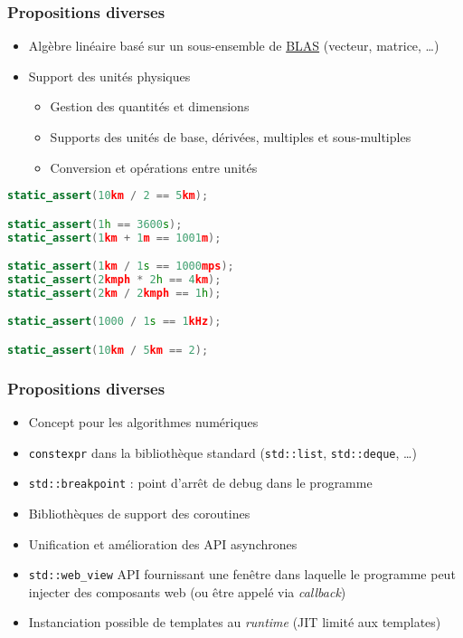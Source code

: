 \documentclass[C++.tex]{subfiles}
\begin{document}
\begin{frame}[fragile]
	\frametitle{Propositions diverses}
	\begin{itemize}
		\item Algèbre linéaire basé sur un sous-ensemble de \href{https://www.netlib.org/blas/}{BLAS} (vecteur, matrice, \ldots)
		\item Support des unités physiques
		\begin{itemize}
			\item Gestion des quantités et dimensions
			\item Supports des unités de base, dérivées, multiples et sous-multiples
			\item Conversion et opérations entre unités
		\end{itemize}
	\end{itemize}

	\begin{lstlisting}[language=C++]
static_assert(10km / 2 == 5km);

static_assert(1h == 3600s);
static_assert(1km + 1m == 1001m);

static_assert(1km / 1s == 1000mps);
static_assert(2kmph * 2h == 4km);
static_assert(2km / 2kmph == 1h);

static_assert(1000 / 1s == 1kHz);

static_assert(10km / 5km == 2);\end{lstlisting}
\end{frame}

\begin{frame}[fragile]
	\frametitle{Propositions diverses}
	\begin{itemize}
		\item Concept pour les algorithmes numériques
		\item \lstinline|constexpr| dans la bibliothèque standard (\lstinline|std::list|, \lstinline|std::deque|, \ldots)


		\item \lstinline|std::breakpoint| : point d'arrêt de debug dans le programme
		\item Bibliothèques de support des coroutines
		\item Unification et amélioration des API asynchrones


		\item \lstinline|std::web_view| API fournissant une fenêtre dans laquelle le programme peut injecter des composants web (ou être appelé via \textit{callback})
		\item Instanciation possible de templates au \textit{runtime} (JIT limité aux templates)

	\end{itemize}
\end{frame}
\end{document}
